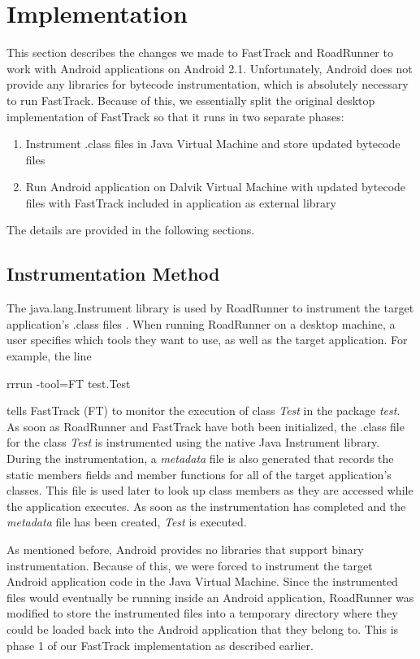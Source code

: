 \documentclass{acm_proc_article-sp}
\begin{document}
\section{Implementation}
This section describes the changes we made to FastTrack and RoadRunner to work with Android applications on Android 2.1. Unfortunately, Android does not provide any libraries for bytecode instrumentation, which is absolutely necessary to run FastTrack. Because of this, we essentially split the original desktop implementation of FastTrack so that it runs in two separate phases:

\begin{enumerate}
\item Instrument .class files in Java Virtual Machine and store updated bytecode files
\item Run Android application on Dalvik Virtual Machine with updated bytecode files with FastTrack included in application as external library
\end{enumerate}

The details are provided in the following sections.


\subsection{Instrumentation Method}
The java.lang.Instrument library is used by RoadRunner to instrument the target application's .class files \cite{Flanagan2009}. When running RoadRunner on a desktop machine, a user specifies which tools they want to use, as well as the target application. For example, the line 
\begin{code}
	rrrun -tool=FT test.Test
\end{code}
tells FastTrack (FT) to monitor the execution of class \emph{Test} in the package \emph{test}. As soon as RoadRunner and FastTrack have both been initialized, the .class file for the class \emph{Test} is instrumented using the native Java Instrument library. During the instrumentation, a \emph{metadata} file is also generated that records the static members fields and member functions for all of the target application's classes. This file is used later to look up class members as they are accessed while the application executes. As soon as the instrumentation has completed and the \emph{metadata} file has been created, \emph{Test} is executed. 

As mentioned before, Android provides no libraries that support binary instrumentation. Because of this, we were forced to instrument the target Android application code in the Java Virtual Machine. Since the instrumented files would eventually be running inside an Android application, RoadRunner was modified to store the instrumented files into a temporary directory where they could be loaded back into the Android application that they belong to. This is phase 1 of our FastTrack implementation as described earlier.
\end{document}
